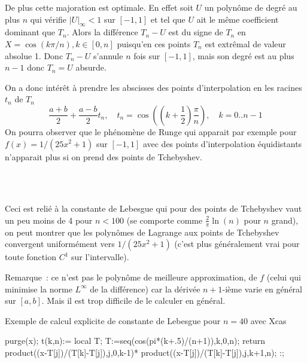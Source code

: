 \documentclass[a4paper,11pt]{article}
\begin{document}
\begin{giacjshere}
De plus cette majoration est optimale. En effet
soit $U$ un polyn\^ome de degr\'e au plus $n$ 
qui v\'erifie $|U|_\infty<1$ sur $[-1,1]$
et tel que $U$ ait le m\^eme coefficient dominant que
$T_n$. Alors la diff\'erence $T_n-U$ est du signe de $T_n$ en
$X=\cos(k\pi/n), k \in [0,n]$ puisqu'en ces points $T_n$ est
extr\^emal de valeur absolue 1. Donc $T_n-U$ s'annule $n$ fois sur
$[-1,1]$, mais son degr\'e est au plus $n-1$ donc $T_n=U$ absurde.

On a donc int\'er\^et \`a prendre les abscisses des points
d'interpolation en les racines $t_n$ de $T_n$
$$ \frac{a+b}{2} + \frac{a-b}{2} t_n, \quad t_n=\cos((k+\frac{1}{2})\frac\pi n), 
\quad k=0..n-1$$
On pourra observer que le ph\'enom\`ene de 
Runge qui apparait par
exemple pour $f(x)=1/(25x^2+1)$ sur $[-1,1]$ avec des points d'interpolation
\'equidistants n'apparait plus si on prend des points de Tchebyshev.\\
\\

\\

Ceci est reli\'e \`a la constante de Lebesgue 
qui pour des points de Tchebyshev vaut un peu moins de 4 pour $n<100$
(se comporte comme $\frac2\pi \ln(n)$ pour $n$ grand), on peut montrer
que les polyn\^omes de Lagrange aux points de Tchebyshev convergent
uniform\'ement vers $1/(25x^2+1)$ (c'est plus g\'en\'eralement
vrai pour toute fonction $C^1$ sur l'intervalle).

Remarque~: ce n'est pas le polyn\^ome de meilleure approximation,
de $f$ (celui qui minimise la norme $L^\infty$ de la diff\'erence)
car la d\'eriv\'ee $n+1$-i\`eme varie en g\'en\'eral sur $[a,b]$. Mais
il est trop difficile de le calculer en g\'en\'eral.

Exemple de calcul explicite de constante de Lebesgue pour $n=40$ avec
Xcas
\begin{giacprog}
purge(x);
t(k,n):={ 
 local T; 
 T:=seq(cos(pi*(k+.5)/(n+1)),k,0,n);
 return product((x-T[j])/(T[k]-T[j]),j,0,k-1)*
  product((x-T[j])/(T[k]-T[j]),j,k+1,n);
}:;
\end{giacprog}


\end{giacjshere}
\end{document}
